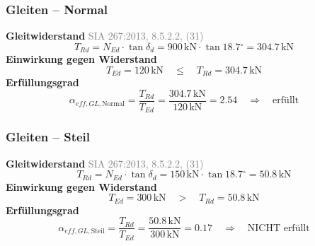\documentclass[11pt,a4paper]{article}
\newcommand{\normref}[1]{{\small\textcolor{gray}{#1}}}
\begin{document}
\subsubsection{Gleiten – Normal}
\noindent\textbf{Gleitwiderstand} \hfill \normref{SIA 267:2013, 8.5.2.2, (31)}
\begin{equation*}
T_{Rd} = N_{Ed} \cdot \tan \delta_d = 900\,\mathrm{kN} \cdot \tan 18.7{}^{\circ} = 304.7\,\mathrm{kN}
\end{equation*}
\noindent\textbf{Einwirkung gegen Widerstand}
\begin{equation*}
T_{Ed} = 120\,\mathrm{kN} \quad \le \quad T_{Rd} = 304.7\,\mathrm{kN}
\end{equation*}
\noindent\textbf{Erfüllungsgrad}
\begin{equation*}
\alpha_{eff,GL,\text{Normal}} = \frac{T_{Rd}}{T_{Ed}} = \frac{304.7\,\mathrm{kN}}{120\,\mathrm{kN}} = 2.54 \quad \Rightarrow \quad \text{erfüllt}
\end{equation*}
\subsubsection{Gleiten – Steil}
\noindent\textbf{Gleitwiderstand} \hfill \normref{SIA 267:2013, 8.5.2.2, (31)}
\begin{equation*}
T_{Rd} = N_{Ed} \cdot \tan \delta_d = 150\,\mathrm{kN} \cdot \tan 18.7{}^{\circ} = 50.8\,\mathrm{kN}
\end{equation*}
\noindent\textbf{Einwirkung gegen Widerstand}
\begin{equation*}
T_{Ed} = 300\,\mathrm{kN} \quad > \quad T_{Rd} = 50.8\,\mathrm{kN}
\end{equation*}
\noindent\textbf{Erfüllungsgrad}
\begin{equation*}
\alpha_{eff,GL,\text{Steil}} = \frac{T_{Rd}}{T_{Ed}} = \frac{50.8\,\mathrm{kN}}{300\,\mathrm{kN}} = 0.17 \quad \Rightarrow \quad \text{NICHT erfüllt}
\end{equation*}
\end{document}
